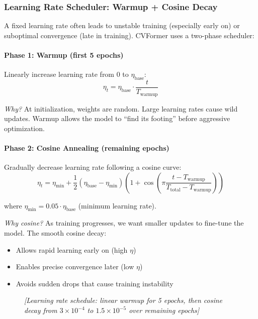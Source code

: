 \documentclass[12pt,a4paper]{article}
\begin{document}
\subsubsection{Learning Rate Scheduler: Warmup + Cosine Decay}

A fixed learning rate often leads to unstable training (especially early on) or suboptimal convergence (late in training). CVFormer uses a two-phase scheduler:

\paragraph{Phase 1: Warmup (first 5 epochs)}
Linearly increase learning rate from 0 to $\eta_{\text{base}}$:
\begin{equation}
\eta_t = \eta_{\text{base}} \cdot \frac{t}{T_{\text{warmup}}}
\end{equation}

\textit{Why?} At initialization, weights are random. Large learning rates cause wild updates. Warmup allows the model to ``find its footing'' before aggressive optimization.

\paragraph{Phase 2: Cosine Annealing (remaining epochs)}
Gradually decrease learning rate following a cosine curve:
\begin{equation}
\eta_t = \eta_{\text{min}} + \frac{1}{2}(\eta_{\text{base}} - \eta_{\text{min}})\left(1 + \cos\left(\pi \frac{t - T_{\text{warmup}}}{T_{\text{total}} - T_{\text{warmup}}}\right)\right)
\end{equation}

where $\eta_{\text{min}} = 0.05 \cdot \eta_{\text{base}}$ (minimum learning rate).

\textit{Why cosine?} As training progresses, we want smaller updates to fine-tune the model. The smooth cosine decay:
\begin{itemize}
    \item Allows rapid learning early on (high $\eta$)
    \item Enables precise convergence later (low $\eta$)
    \item Avoids sudden drops that cause training instability
\end{itemize}

\begin{figure}[h]
\centering
\textit{[Learning rate schedule: linear warmup for 5 epochs, then cosine decay from $3 \times 10^{-4}$ to $1.5 \times 10^{-5}$ over remaining epochs]}
\end{figure}
\end{document}
